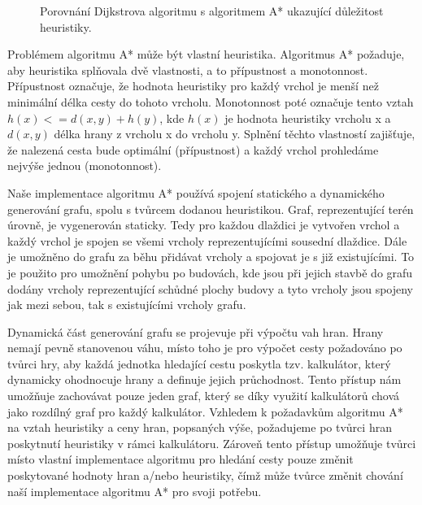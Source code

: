 \begin{figure}[h]
	\centering
	\hfill
	\caption{Porovnání Dijkstrova algoritmu s algoritmem A* ukazující důležitost heuristiky.}
	\label{fig:astardijkstra}
\end{figure}

Problémem algoritmu A* může být vlastní heuristika. Algoritmus A* požaduje, aby heuristika splňovala dvě vlastnosti, a to přípustnost a monotonnost. Přípustnost označuje, že hodnota heuristiky pro každý vrchol je menší než minimální délka cesty do tohoto vrcholu. Monotonnost poté označuje tento vztah \(h(x) <= d(x,y) + h(y)\), kde \(h(x)\) je hodnota heuristiky vrcholu x a \(d(x,y)\) délka hrany z vrcholu x do vrcholu y. Splnění těchto vlastností zajišťuje, že nalezená cesta bude optimální (přípustnost) a každý vrchol prohledáme nejvýše jednou (monotonnost). 

Naše implementace algoritmu A* používá spojení statického a dynamického generování grafu, spolu s tvůrcem dodanou heuristikou. Graf, reprezentující terén úrovně, je vygenerován staticky. Tedy pro každou dlaždici je vytvořen vrchol a každý vrchol je spojen se všemi vrcholy reprezentujícími sousední dlaždice. Dále je umožněno do grafu za běhu přidávat vrcholy a spojovat je s již existujícími. To je použito pro umožnění pohybu po budovách, kde jsou při jejich stavbě do grafu dodány vrcholy reprezentující schůdné plochy budovy a tyto vrcholy jsou spojeny jak mezi sebou, tak s existujícími vrcholy grafu. 

Dynamická část generování grafu se projevuje při výpočtu vah hran. Hrany nemají pevně stanovenou váhu, místo toho je pro výpočet cesty požadováno po tvůrci hry, aby každá jednotka hledající cestu poskytla tzv. kalkulátor, který dynamicky ohodnocuje hrany a definuje jejich průchodnost. Tento přístup nám umožňuje zachovávat pouze jeden graf, který se díky využití kalkulátorů chová jako rozdílný graf pro každý kalkulátor. 
Vzhledem k požadavkům algoritmu A* na vztah heuristiky a ceny hran, popsaných výše, požadujeme po tvůrci hran poskytnutí heuristiky v rámci kalkulátoru. Zároveň tento přístup umožňuje tvůrci místo vlastní implementace algoritmu pro hledání cesty pouze změnit poskytované hodnoty hran a/nebo heuristiky, čímž může tvůrce změnit chování naší implementace algoritmu A* pro svoji potřebu.


